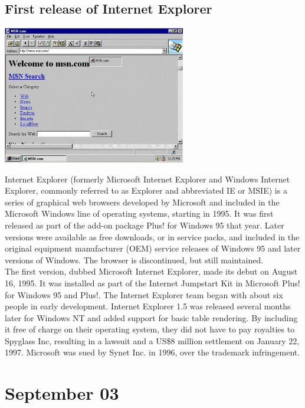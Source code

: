 \documentclass[11pt]{report}
\begin{document}
\subsection{First release of Internet Explorer}
\vspace{2mm}\begin{center}\includegraphics[width=8cm]{./img/internetExplorer.jpg}\end{center}
Internet Explorer (formerly Microsoft Internet Explorer and Windows Internet Explorer, commonly referred to as Explorer and abbreviated IE or MSIE) is a series of graphical web browsers developed by Microsoft and included in the Microsoft Windows line of operating systems, starting in 1995. It was first released as part of the add-on package Plus! for Windows 95 that year. Later versions were available as free downloads, or in service packs, and included in the original equipment manufacturer (OEM) service releases of Windows 95 and later versions of Windows. The browser is discontinued, but still maintained.\\\indent The first version, dubbed Microsoft Internet Explorer, made its debut on August 16, 1995. It was installed as part of the Internet Jumpstart Kit in Microsoft Plus! for Windows 95 and Plus!. The Internet Explorer team began with about six people in early development. Internet Explorer 1.5 was released several months later for Windows NT and added support for basic table rendering. By including it free of charge on their operating system, they did not have to pay royalties to Spyglass Inc, resulting in a lawsuit and a US\$8 million settlement on January 22, 1997.
Microsoft was sued by Synet Inc. in 1996, over the trademark infringement.
\section{September 03}
\end{document}
